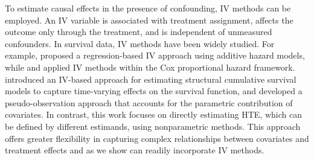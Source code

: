  

To estimate causal effects in the presence of confounding, IV methods can be employed\cite{angrist_identification_1996, abadie_semiparametric_2003, hernan_instruments_2006}. An IV variable is associated with treatment assignment, affects the outcome only through the treatment, and is independent of unmeasured confounders. In survival data, IV methods have been widely studied. For example, \citet{tchetgen_tchetgen_instrumental_2015} proposed a regression-based IV approach using additive hazard models, while \citet{sorensen_causal_2019} and \citet{mackenzie_using_2014} applied IV methods within the Cox proportional hazard framework. \citet{martinussen_instrumental_2017} introduced an IV-based approach for estimating structural cumulative survival models to capture time-varying effects on the survival function, and \citet{kjaersgaard_instrumental_2015} developed a pseudo-observation approach that accounts for the parametric contribution of covariates. In contrast, this work focuses on directly estimating HTE, which can be defined by different estimands, using nonparametric methods.  This approach offers greater flexibility in capturing complex relationships between covariates and treatment effects and as we show can readily incorporate IV methods.